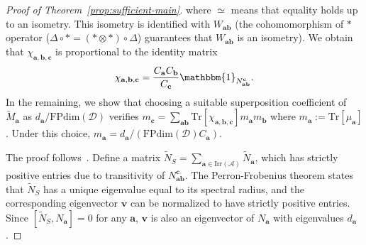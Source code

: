 \documentclass[prx, twocolumn, superscriptaddress, dvipsnames]{revtex4-2}
\theoremstyle{definition}
\newcommand{\tr}{\mathrm{Tr}}
\newcommand{\bo}{\mathbbm{1}}
\newcommand{\mA}{\mathcal{A}}
\newcommand{\vbnt}{\mathbf{a}}
\def\XQ#1{{\color{XQ}#1}}
\begin{document}
\begin{proof}[Proof of Theorem~\ref{prop:sufficient-main}]
where $\simeq$ means that equality holds up to an isometry. This isometry is identified with $W_{\mathbf{ab}}$ (the cohomomorphism of $*$ operator ($\Delta\circ *=(*\otimes *)\circ\Delta$) guarantees that $W_{\mathbf{ab}}$ is an isometry).
We obtain that $\chi_{\mathbf{a,b,c}}$ is proportional to the identity matrix 
\begin{equation}
    \chi_{\mathbf{a,b,c}}=\frac{C_\vbnt C_\mathbf{b}}{C_\mathbf{c}} \bo_{N_{\mathbf{ab}}^\mathbf{c}}.
\end{equation}
In the remaining, we show that choosing a suitable superposition coefficient of $\tilde{M}_\vbnt$ as $d_\vbnt/\mathrm{FPdim}(\mathcal D)$ verifies $m_{\mathbf{c}}=\sum_{\mathbf{ab}} \tr[\chi_{\mathbf{a,b,c}}] m_\vbnt m_\mathbf{b}$ where $m_\vbnt:=\tr[\mu_\vbnt]$. Under this choice,  $m_\vbnt = d_\vbnt/(\mathrm{FPdim}(\mathcal D) C_\vbnt)$. 

The proof follows~\cite{etingof2015tensor}. 
    Define a matrix $\tilde{N}_S=\sum_{\vbnt\in\text{Irr}(\mA)} \tilde{N}_\vbnt$, which has strictly positive entries due to transitivity of $N_{\mathbf{ab}}^\mathbf{c}$. The Perron-Frobenius theorem states that $\tilde{N}_S$ has a unique eigenvalue equal to its spectral radius, and the corresponding eigenvector $\textbf{v}$ can be normalized to have strictly positive entries. Since $[\tilde{N}_S, N_\vbnt]=0$ for any $\vbnt$, $\textbf{v}$ is also an eigenvector of $N_\vbnt$ with eigenvalues $d_\vbnt$. 

    

\end{proof}
\end{document}
